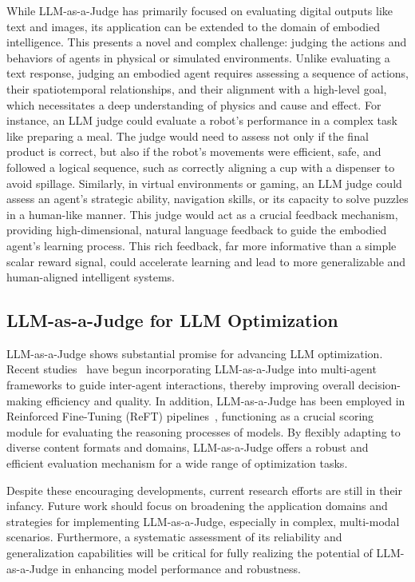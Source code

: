 \documentclass[acmsmall,screen]{acmart}
\begin{document}
While LLM-as-a-Judge has primarily focused on evaluating digital outputs like text and images, its application can be extended to the domain of embodied intelligence. This presents a novel and complex challenge: judging the actions and behaviors of agents in physical or simulated environments. Unlike evaluating a text response, judging an embodied agent requires assessing a sequence of actions, their spatiotemporal relationships, and their alignment with a high-level goal, which necessitates a deep understanding of physics and cause and effect. For instance, an LLM judge could evaluate a robot's performance in a complex task like preparing a meal. The judge would need to assess not only if the final product is correct, but also if the robot's movements were efficient, safe, and followed a logical sequence, such as correctly aligning a cup with a dispenser to avoid spillage. Similarly, in virtual environments or gaming, an LLM judge could assess an agent's strategic ability, navigation skills, or its capacity to solve puzzles in a human-like manner. This judge would act as a crucial feedback mechanism, providing high-dimensional, natural language feedback to guide the embodied agent's learning process. This rich feedback, far more informative than a simple scalar reward signal, could accelerate learning and lead to more generalizable and human-aligned intelligent systems.




\subsection{LLM-as-a-Judge for LLM Optimization}
LLM-as-a-Judge shows substantial promise for advancing LLM optimization. Recent studies~\cite{aaaj} have begun incorporating LLM-as-a-Judge into multi-agent frameworks to guide inter-agent interactions, thereby improving overall decision-making efficiency and quality. In addition, LLM-as-a-Judge has been employed in Reinforced Fine-Tuning (ReFT) pipelines~\cite{trung2024reft}, functioning as a crucial scoring module for evaluating the reasoning processes of models. By flexibly adapting to diverse content formats and domains, LLM-as-a-Judge offers a robust and efficient evaluation mechanism for a wide range of optimization tasks.

Despite these encouraging developments, current research efforts are still in their infancy. Future work should focus on broadening the application domains and strategies for implementing LLM-as-a-Judge, especially in complex, multi-modal scenarios. Furthermore, a systematic assessment of its reliability and generalization capabilities will be critical for fully realizing the potential of LLM-as-a-Judge in enhancing model performance and robustness.
\end{document}
